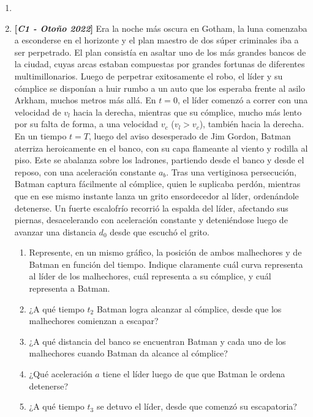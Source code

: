 \documentclass[letterpaper,11pt]{article}
\begin{document}
\vspace{-1cm}
\begin{enumerate}\setlength{\itemsep}{0.4cm}


\item[]

\item  \textbf{[\textit{C1 - Otoño 2022}]} Era la noche más oscura en Gotham, la luna comenzaba a esconderse en el horizonte
y el plan maestro de dos súper criminales iba a ser perpetrado. El plan consistía en asaltar
uno de los más grandes bancos de la ciudad, cuyas arcas estaban compuestas por grandes
fortunas de diferentes multimillonarios. Luego de perpetrar exitosamente el robo, el líder y
su cómplice se disponían a huir rumbo a un auto que los esperaba frente al asilo Arkham,
muchos metros más allá. En $t = 0$, el líder comenzó a correr con una velocidad de $v_l$ hacia la
derecha, mientras que su cómplice, mucho más lento por su falta de forma, a una velocidad
$v_c$ ($v_l > v_c$), también hacia la derecha. En un tiempo $t = T$, luego del aviso desesperado
de Jim Gordon, Batman aterriza heroicamente en el banco, con su capa flameante al viento
y rodilla al piso. Este se abalanza sobre los ladrones, partiendo desde el banco y desde el
reposo, con una aceleración constante $a_b$. Tras una vertiginosa persecución, Batman captura
fácilmente al cómplice, quien le suplicaba perdón, mientras que en ese mismo instante lanza
un grito ensordecedor al líder, ordenándole detenerse. Un fuerte escalofrío recorrió la espalda
del líder, afectando sus piernas, desacelerando con aceleración constante y deteniéndose luego
de avanzar una distancia $d_0$ desde que escuchó el grito.


\begin{enumerate}
    \item Represente, en un mismo gráfico, la posición de ambos malhechores y de Batman en
función del tiempo. Indique claramente cuál curva representa al líder de los malhechores,
cuál representa a su cómplice, y cuál representa a Batman.
    \item ¿A qué tiempo $t_2$ Batman logra alcanzar al cómplice, desde que los malhechores
comienzan a escapar?
    \item ¿A qué distancia del banco se encuentran Batman y cada uno de los malhechores
cuando Batman da alcance al cómplice?
    \item ¿Qué aceleración $a$ tiene el líder luego de que que Batman le ordena detenerse?
    \item ¿A qué tiempo $t_3$ se detuvo el líder, desde que comenzó su escapatoria?
\end{enumerate}


\end{enumerate}
\end{document}
